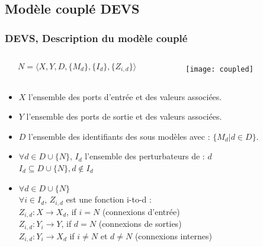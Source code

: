 \documentclass[xetex, compress, table, svgnames]{beamer}
\begin{document}
\subsection{Modèle couplé DEVS}

\begin{frame}
  \frametitle{DEVS, Description du modèle couplé}
  \begin{exampleblock}{}
    \begin{columns}
      \begin{column}[c]{.45\textwidth}
        \begin{equation*}
          N = \langle X, Y, D, \{M_d\}, \{I_d\}, \{Z_{i,d}\} \rangle
        \end{equation*}
      \end{column}
      \begin{column}{.45\textwidth}
        \begin{figure}[h]
          \begin{center}
            \texttt{[image: coupled]}
          \end{center}
        \end{figure}
      \end{column}
    \end{columns}
  \end{exampleblock}
  \begin{exampleblock}{}
    \begin{itemize}[<+->]
    \item $X$ l'ensemble des \alert{ports d'entrée} et des valeurs
      associées.
    \item $Y$ l'ensemble des \alert{ports de sortie} et des valeurs
      associées.
    \item $D$ l'ensemble des \alert{identifiants des sous modèles}
      avec : $\{ M_d | d \in D \}$.
    \item $\forall d \in D \cup \{N\}$, $I_d$ l'ensemble des perturbateurs de : $d$\\$I_d \subseteq D \cup \{N\},d \notin I_d$
    \item $\forall d \in D \cup \{N\}$\\
      $\forall i \in I_d$, $Z_{i,d}$ est une fonction i-to-d :\\
      \hspace{1cm}$Z_{i,d}:X \rightarrow X_d$, if $i = N$ (connexions d'entrée)\\
      \hspace{1cm}$Z_{i,d}:Y_i \rightarrow Y$, if $d = N$ (connexions de sorties)\\
      \hspace{1cm}$Z_{i,d}:Y_i \rightarrow X_d$ if $i \neq N$ et $d
      \neq N$ (connexions internes)
    \end{itemize}
  \end{exampleblock}
\end{frame}
\end{document}
